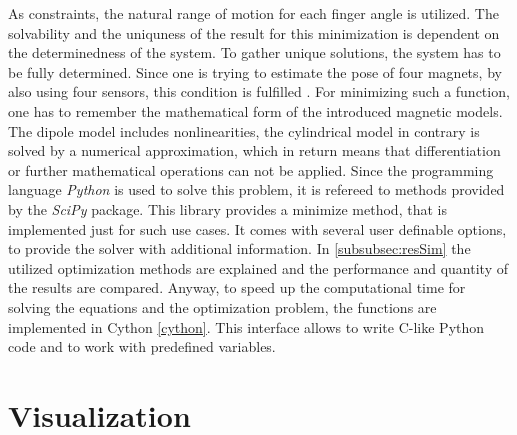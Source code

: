 As constraints, the natural range of motion for each finger angle is utilized. The solvability and the uniquness of the result for this minimization is dependent on the determinedness of the system. To gather unique solutions, the system has to be fully determined. Since one is trying to estimate the pose of four magnets, by also using four sensors, this condition is fulfilled . For minimizing such a function, one has to remember the mathematical form of the introduced magnetic models. The dipole model includes nonlinearities, the cylindrical model in contrary is solved by a numerical approximation, which in return means that differentiation or further mathematical operations can not be applied. Since the programming language \emph{Python} \cite{python} is used to solve this problem, it is refereed to methods provided by the \emph{SciPy} \cite{scipy} package. This library provides a minimize method, that is implemented just for such use cases. It comes with several user definable options, to provide the solver with additional information. In \ref{subsubsec:resSim} the utilized optimization methods are explained and the performance and quantity of the results are compared. Anyway, to speed up the computational time for solving the equations and the optimization problem, the functions are implemented in Cython \ref{cython}. This interface allows to write C-like Python code and to work with predefined variables. 


\section{Visualization} \label{sec:visual}

